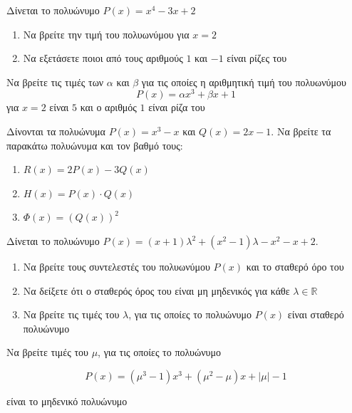 \documentclass{presentation}
\begin{document}
\begin{askisi}
  Δίνεται το πολυώνυμο $P(x)=x^4-3x+2$
  \begin{enumerate}
    \item<1-> Να βρείτε την τιμή του πολυωνύμου για $x=2$
    \item<2-> Να εξετάσετε ποιοι από τους αριθμούς $1$ και $-1$ είναι ρίζες του

  \end{enumerate}

\end{askisi}

\begin{askisi}
  Να βρείτε τις τιμές των $α$ και $β$ για τις οποίες η αριθμητική τιμή του πολυωνύμου
  $$P(x)=αx^3+βx+1$$
  για $x=2$ είναι $5$ και ο αριθμός $1$ είναι ρίζα του

\end{askisi}

\begin{askisi}
  Δίνονται τα πολυώνυμα $P(x)=x^3-x$ και $Q(x)=2x-1$. Να βρείτε τα παρακάτω πολυώνυμα και τον βαθμό τους:
  \begin{enumerate}
    \item<1-> $R(x)=2P(x)-3Q(x)$
    \item<2-> $H(x)=P(x)\cdot Q(x)$
    \item<3-> $Φ(x)=\left( Q(x) \right)^2 $
  \end{enumerate}

\end{askisi}

\begin{askisi}
  Δίνεται το πολυώνυμο $P(x)=(x+1)λ^2+(x^2-1)λ-x^2-x+2$.
  \begin{enumerate}
    \item<1-> Να βρείτε τους συντελεστές του πολυωνύμου $P(x)$ και το σταθερό όρο του
    \item<2-> Να δείξετε ότι ο σταθερός όρος του είναι μη μηδενικός για κάθε $λ\in\mathbb{R}$
    \item<3-> Να βρείτε τις τιμές του $λ$, για τις οποίες το πολυώνυμο $P(x)$ είναι σταθερό πολυώνυμο
  \end{enumerate}

\end{askisi}

\begin{askisi}
  Να βρείτε τιμές του $μ$, για τις οποίες το πολυώνυμο

  $$P(x)=(μ^3-1)x^3+(μ^2-μ)x+|μ|-1$$

  είναι το μηδενικό πολυώνυμο

\end{askisi}
\end{document}
